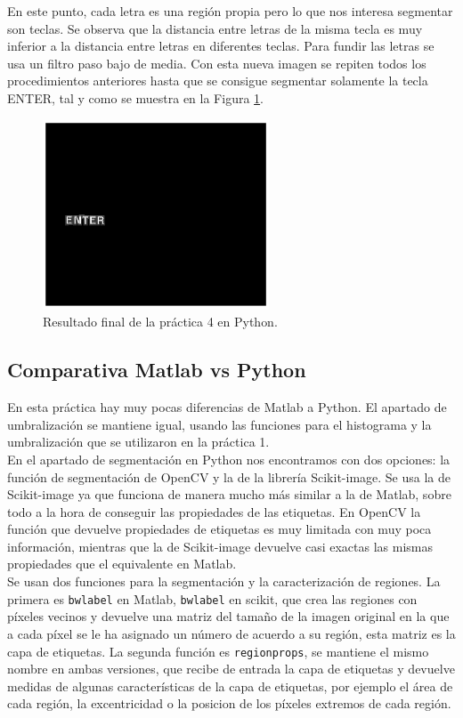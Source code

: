En este punto, cada letra es una región propia pero lo que nos interesa segmentar son teclas. Se observa que la distancia entre letras de la misma tecla es muy inferior a la distancia entre letras en diferentes teclas. Para fundir las letras se usa un filtro paso bajo de media. Con esta nueva imagen se repiten todos los procedimientos anteriores hasta que se consigue segmentar solamente la tecla ENTER, tal y como se muestra en la  Figura \ref{finp4}.

\begin{figure}[h]
\centering
\includegraphics[width=0.6\textwidth]{imagenes/finp4}
\caption{Resultado final de la práctica 4 en Python.}
\label{finp4}
\end{figure}


\subsection{Comparativa Matlab vs Python}

En esta práctica hay muy pocas diferencias de Matlab a Python. El apartado de umbralización se mantiene igual, usando las funciones para el histograma y la umbralización que se utilizaron en la práctica 1.\\

En el apartado de segmentación en Python nos encontramos con dos opciones: la función de segmentación de OpenCV y la de la librería Scikit-image. Se usa la de Scikit-image ya que funciona de manera mucho más similar a la de Matlab, sobre todo a la hora de conseguir las propiedades de las etiquetas. En OpenCV la función que devuelve propiedades de etiquetas es muy limitada con muy poca información, mientras que la de Scikit-image devuelve casi exactas las mismas propiedades que el equivalente en Matlab.\\


 Se usan dos funciones para la segmentación y la caracterización de regiones. La primera es \texttt{bwlabel} en Matlab, \texttt{bwlabel} en scikit,  que crea las regiones con píxeles vecinos y devuelve una matriz del tamaño de la imagen original en la que a cada píxel se le ha asignado un número de acuerdo a su región, esta matriz es la capa de etiquetas. La segunda función es \texttt{regionprops}, se mantiene el mismo nombre en ambas versiones, que recibe de entrada la capa de etiquetas y devuelve medidas de algunas características de la capa de etiquetas, por ejemplo el área de cada región, la excentricidad o la posicion de los píxeles extremos de cada región.\\

